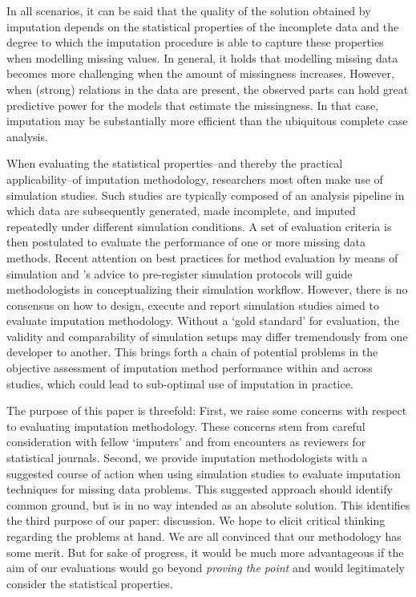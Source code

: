 \documentclass[bimj,fleqn]{w-art}
\begin{document}
In all scenarios, it can be said that the quality of the solution obtained by imputation depends on the statistical properties of the incomplete data and the degree to which the imputation procedure is able to capture these properties when modelling missing values. In general, it holds that modelling missing data becomes more challenging when the amount of missingness increases. However, when (strong) relations in the data are present, the observed parts can hold great predictive power for the models that estimate the missingness. In that case, imputation may be substantially more efficient than the ubiquitous complete case analysis.

When evaluating the statistical properties--and thereby the practical applicability--of imputation methodology, researchers most often make use of simulation studies. Such studies are typically composed of an analysis pipeline in which data are subsequently generated, made incomplete, and imputed repeatedly under different simulation conditions. A set of evaluation criteria is then postulated to evaluate the performance of one or more missing data methods. Recent attention on best practices for method evaluation by means of simulation \citep{morr18} and \citet{pawe22}'s advice to pre-register simulation protocols will guide methodologists in conceptualizing their simulation workflow. However, there is no consensus on how to design, execute and report simulation studies aimed to evaluate imputation methodology. Without a `gold standard' for evaluation, the validity and comparability of simulation setups may differ tremendously from one developer to another. This brings forth a chain of potential problems in the objective assessment of imputation method performance within and across studies, which could lead to sub-optimal use of imputation in practice.


The purpose of this paper is threefold: First, we raise some concerns with respect to evaluating imputation methodology. These concerns stem from careful consideration with fellow `imputers' and from encounters as reviewers for statistical journals. Second, we provide imputation methodologists with a suggested course of action when using simulation studies to evaluate imputation techniques for missing data problems. This suggested approach should identify common ground, but is in no way intended as an absolute solution. This identifies the third purpose of our paper: discussion. We hope to elicit critical thinking regarding the problems at hand. We are all convinced that our methodology has some merit. But for sake of progress, it would be much more advantageous if the aim of our evaluations would go beyond \textit{proving the point} and would legitimately consider the statistical properties. 
\end{document}
